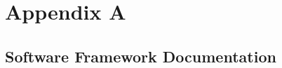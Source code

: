 \chapter{Appendix A}
\section{Software Framework Documentation}\label{sec:FrameworkDoc}

\lipsum[1-2]



